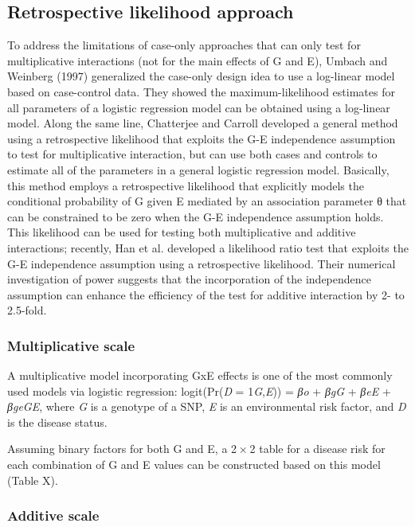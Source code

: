 \documentclass[]{book}
\theoremstyle{definition}
\theoremstyle{definition}
\theoremstyle{definition}
\theoremstyle{remark}
\begin{document}
\subsection{Retrospective likelihood
approach}\label{retrospective-likelihood-approach}

To address the limitations of case-only approaches that can only test
for multiplicative interactions (not for the main effects of G and E),
Umbach and Weinberg (1997) generalized the case-only design idea to use
a log-linear model based on case-control data. They showed the
maximum-likelihood estimates for all parameters of a logistic regression
model can be obtained using a log-linear model. Along the same line,
Chatterjee and Carroll developed a general method using a retrospective
likelihood that exploits the G-E independence assumption to test for
multiplicative interaction, but can use both cases and controls to
estimate all of the parameters in a general logistic regression model.
Basically, this method employs a retrospective likelihood that
explicitly models the conditional probability of G given E mediated by
an association parameter θ that can be constrained to be zero when the
G-E independence assumption holds. This likelihood can be used for
testing both multiplicative and additive interactions; recently, Han et
al. developed a likelihood ratio test that exploits the G-E independence
assumption using a retrospective likelihood. Their numerical
investigation of power suggests that the incorporation of the
independence assumption can enhance the efficiency of the test for
additive interaction by 2- to 2.5-fold.

\subsubsection{Multiplicative scale}\label{multiplicative-scale}

A multiplicative model incorporating GxE effects is one of the most
commonly used models via logistic regression: logit(Pr(\emph{D} =
1\textbar{}\emph{G},\emph{E})) = \emph{βo} + \emph{βgG} + \emph{βeE} +
\emph{βgeGE}, where \emph{G} is a genotype of a SNP, \emph{E} is an
environmental risk factor, and \emph{D} is the disease status.

Assuming binary factors for both G and E, a 2 × 2 table for a disease
risk for each combination of G and E values can be constructed based on
this model (Table X).

\subsubsection{Additive scale}\label{additive-scale}
\end{document}
